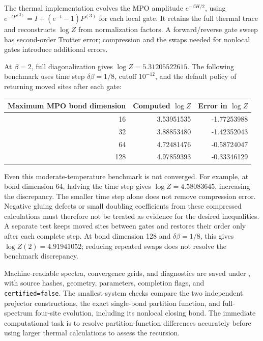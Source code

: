 \documentclass[11pt]{article}
\begin{document}
The thermal implementation evolves the MPO amplitude
\(e^{-\beta H/2}\), using
\(e^{-tP^{(3)}}=I+(e^{-t}-1)P^{(3)}\) for each local gate.
It retains the full thermal trace and reconstructs \(\log Z\) from
normalization factors. A forward/reverse gate sweep has second-order
Trotter error; compression and the swaps needed for nonlocal gates
introduce additional errors.

At \(\beta=2\), full diagonalization gives
\(\log Z=5.31205522615\). The following benchmark uses time step
\(\delta\beta=1/8\), cutoff \(10^{-12}\), and the default policy
of returning moved sites after each gate:
\begin{center}
	\begin{tabular}{rrr}
		\toprule
		Maximum MPO bond dimension & Computed \(\log Z\) & Error in \(\log Z\) \\
		\midrule
		16                         & 3.53951535          & -1.77253988         \\
		32                         & 3.88853480          & -1.42352043         \\
		64                         & 4.72481476          & -0.58724047         \\
		128                        & 4.97859393          & -0.33346129         \\
		\bottomrule
	\end{tabular}
\end{center}
Even this moderate-temperature benchmark is not converged. For example,
at bond dimension 64, halving the time step gives
\(\log Z=4.58083645\), increasing the discrepancy. The smaller time
step alone does not remove compression error. Negative gluing defects
or small doubling coefficients from these compressed calculations must
therefore not be treated as evidence for the desired inequalities.
A separate test keeps moved sites between gates and restores their
order only after each complete step. At bond dimension 128 and
\(\delta\beta=1/8\), this gives \(\log Z(2)=4.91941052\);
reducing repeated swaps does not resolve the benchmark discrepancy.

Machine-readable spectra, convergence grids, and diagnostics are saved
under , with source hashes, geometry, parameters,
completion flags, and \texttt{certified=false}. The smallest-system
checks compare the two independent projector constructions, the exact
single-bond partition function, and full-spectrum four-site evolution,
including its nonlocal closing bond. The immediate computational task
is to resolve partition-function differences accurately before using
larger thermal calculations to assess the recursion.
\end{document}
